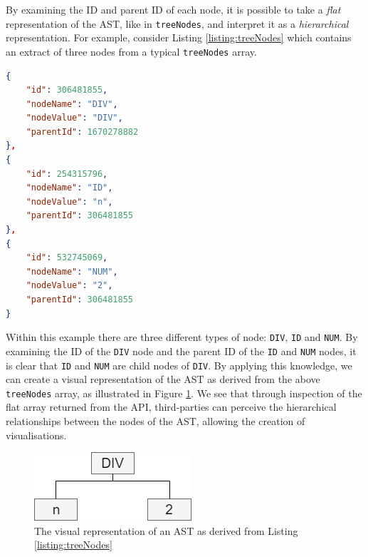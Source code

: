 \documentclass{l4proj}
\begin{document}
By examining the ID and parent ID of each node, it is possible to take a \textit{flat} representation of the AST, like in \texttt{treeNodes}, and interpret it as a \textit{hierarchical} representation. For example, consider Listing \ref{listing:treeNodes} which contains an extract of three nodes from a typical \texttt{treeNodes} array.
\begin{lstlisting}[language=json, caption=Extract from a \texttt{treeNodes} array, label=listing:treeNodes]
{
	"id": 306481855,
	"nodeName": "DIV",
	"nodeValue": "DIV",
	"parentId": 1670278882
},
{
	"id": 254315796,
	"nodeName": "ID",
	"nodeValue": "n",
	"parentId": 306481855
},
{
	"id": 532745069,
	"nodeName": "NUM",
	"nodeValue": "2",
	"parentId": 306481855
}
\end{lstlisting}
Within this example there are three different types of node: \texttt{DIV}, \texttt{ID} and \texttt{NUM}. By examining the ID of the \texttt{DIV} node and the parent ID of the \texttt{ID} and \texttt{NUM} nodes, it is clear that \texttt{ID} and \texttt{NUM} are child nodes of \texttt{DIV}. By applying this knowledge, we can create a visual representation of the AST as derived from the above \texttt{treeNodes} array, as illustrated in Figure \ref{fig:treeNodes}. We see that through inspection of the flat array returned from the API, third-parties can perceive the hierarchical relationships between the nodes of the AST, allowing the creation of visualisations.
\begin{figure}[h]
\centering
\includegraphics[scale=0.6]{images/treeNodes.png}
\caption{The visual representation of an AST as derived from Listing \ref{listing:treeNodes}}
\label{fig:treeNodes}	
\end{figure}
\end{document}
